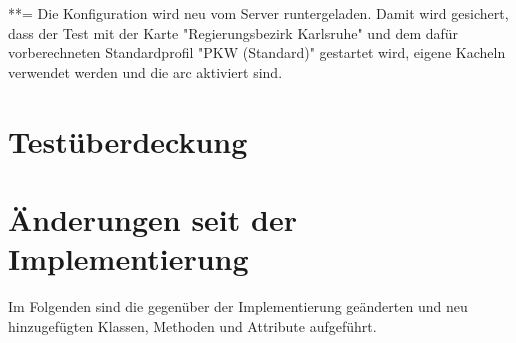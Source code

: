 \documentclass[a4paper, 11pt]{article}
\begin{document}
**= Die Konfiguration wird neu vom Server runtergeladen. Damit wird gesichert, dass der Test mit der Karte "Regierungsbezirk Karlsruhe" und dem dafür vorberechneten Standardprofil "PKW (Standard)" gestartet wird, eigene Kacheln verwendet werden und die \gls{arc} aktiviert sind.

\section{Testüberdeckung}

\section{Änderungen seit der Implementierung}
Im Folgenden sind die gegenüber der Implementierung geänderten und neu hinzugefügten Klassen, Methoden und Attribute aufgeführt.
\end{document}
